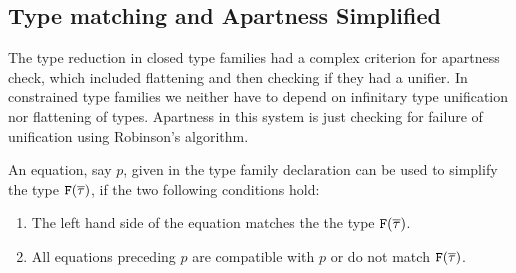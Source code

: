 \documentclass[format=acmsmall,manuscript,screen,nonacm,margin=1in,11pt]{acmart}
\begin{document}
\subsection{Type matching and Apartness Simplified}
The type reduction in closed type families had a complex criterion for apartness check, which included
flattening and then checking if they had a unifier.
In constrained type families we neither have to depend on infinitary type unification
nor flattening of types. 
Apartness in this system is just checking for failure of unification using
Robinson's algorithm.

\begin{defn}\label{def:qtf-simpl}
  An equation, say $p$, given in the type family declaration can be used to simplify the type
  $\texttt{F}(\overline{\tau})$, if the two following conditions hold:
  \begin{enumerate}
  \item The left hand side of the equation matches the the type $\texttt{F}(\overline{\tau})$.
  \item All equations preceding $p$ are compatible with $p$ or do not match $\texttt{F}(\overline{\tau})$.
  \end{enumerate}
\end{defn}
\end{document}
